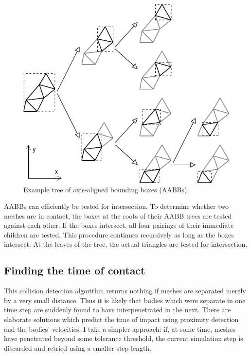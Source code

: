 \begin{figure}
\centerline{\includegraphics{figures/coll-volumes}}
\caption{Example tree of axis-aligned bounding boxes (AABBs).\label{collisionVolumes}}
\end{figure}

AABBs can efficiently be tested for intersection. To determine whether two meshes are in
contact, the boxes at the roots of their AABB trees are tested against each other. If the boxes
intersect, all four pairings of their immediate children are tested. This procedure continues
recursively as long as the boxes intersect. At the leaves of the tree, the actual triangles are
tested for intersection.

\subsection{Finding the time of contact\label{findingContactTime}}

This collision detection algorithm returns nothing if meshes are separated merely by a very small
distance. Thus it is likely that bodies which were separate in one time step are suddenly found
to have interpenetrated in the next. There are elaborate solutions which predict the time of
impact using proximity detection and the bodies' velocities. I take a simpler approach: if, at
some time, meshes have penetrated beyond some tolerance threshold, the current simulation step
is discarded and retried using a smaller step length.

